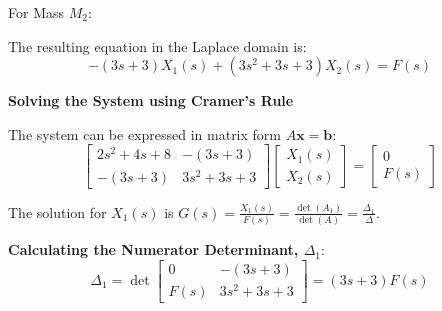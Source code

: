﻿\documentclass[11pt]{article}
\begin{document}
\vspace{12pt}
{For Mass $M_2$:}
\begin{figure}[h!]
\centering
{}
\end{figure}

The resulting equation in the Laplace domain is:
\begin{equation}
-(3s + 3)X_1(s) + (3s^2 + 3s + 3)X_2(s) = F(s) \tag{2}
\end{equation}

\newpage
\noindent\textbf{Solving the System using Cramer's Rule}
\vspace{12pt}

The system can be expressed in matrix form $A\mathbf{x} = \mathbf{b}$:
$$
\begin{bmatrix}
2s^2 + 4s + 8 & -(3s + 3) \\
-(3s + 3) & 3s^2 + 3s + 3
\end{bmatrix}
\begin{bmatrix}
X_1(s) \\
X_2(s)
\end{bmatrix}
=
\begin{bmatrix}
0 \\
F(s)
\end{bmatrix}
$$

The solution for $X_1(s)$ is $G(s) = \frac{X_1(s)}{F(s)} = \frac{\det(A_1)}{\det(A)} = \frac{\Delta_1}{\Delta}$.

\vspace{12pt}
\noindent\textbf{Calculating the Numerator Determinant, $\Delta_1$}:
$$ \Delta_1 = \det
\begin{bmatrix}
0 & -(3s + 3) \\
F(s) & 3s^2 + 3s + 3
\end{bmatrix}
= (3s + 3)F(s) $$
\end{document}
